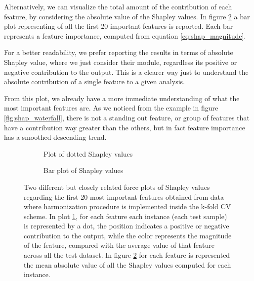 \documentclass[11pt]{report}
\begin{document}
Alternatively, we can visualize the total amount of the contribution of each feature, by considering the absolute value of the Shapley values. In figure \ref{fig:shap_bar_kfold} a bar plot representing of all the first 20 important features is reported.
Each bar represents a feature importance, computed from equation \ref{eq:shap_magnitude}.

For a better readability, we prefer reporting the results in terms of absolute Shapley value, where we just consider their module, regardless its positive or negative contribution to the output.
This is a clearer way just to understand the absolute contribution of a single feature to a given analysis.

From this plot, we already have a more immediate understanding of what the most important features are.
As we noticed from the example in figure \ref{fig:shap_waterfall}, there is not a standing out feature, or group of features that have a contribution way greater than the others, but in fact feature importance has a smoothed descending trend.

\begin{figure}[h!]
\centering
\begin{subfigure}[t]{.45\linewidth}
   \caption{Plot of dotted Shapley values}
   \label{fig:shap_dot_kfold}
\end{subfigure}
\hspace{3mm}
\begin{subfigure}[t]{.439\linewidth}
   \caption{Bar plot of Shapley values}
   \label{fig:shap_bar_kfold}
\end{subfigure}
\caption{Two different but closely related force plots of Shapley values regarding the first 20 most important features obtained from data where harmonization procedure is implemented inside the k-fold CV scheme.
In plot \ref{fig:shap_dot_kfold}, for each feature each instance (each test sample) is represented by a dot, the position indicates a positive or negative contribution to the output, while the color represents the magnitude of the feature, compared with the average value of that feature across all the test dataset.
In figure \ref{fig:shap_bar_kfold} for each feature is represented the mean absolute value of all the Shapley values computed for each instance.
}
\label{fig:shap_features_kfold_both}
\end{figure}
\end{document}
